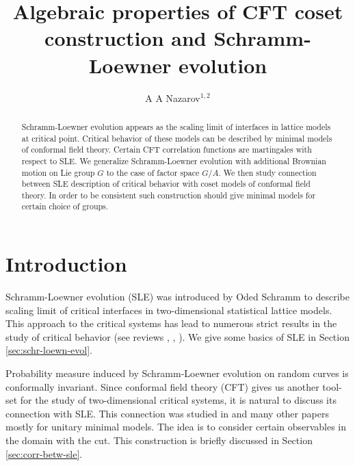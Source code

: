 \documentclass[a4paper]{jpconf}
\theoremstyle{definition}
\theoremstyle{definition} \newtheorem{Def}{Definition}
\begin{document}
\title{Algebraic properties of CFT coset construction and Schramm-Loewner evolution}
\author{A A Nazarov$^{1,2}$}
\address{
  $^1$ Department of High-Energy and Elementary Particle Physics, 
  Faculty of Physics, \\ SPb State University
  198904, Saint-Petersburg, Russia}
\address{
  $^{2}$ Chebyshev Laboratory,
  Faculty of Mathematics and Mechanics, \\ SPb State University
  199178, Saint-Petersburg, Russia}


\begin{abstract}
  Schramm-Loewner evolution appears as the scaling limit of interfaces in lattice models at critical point. Critical behavior of these models can be described by minimal models of conformal field theory. Certain CFT correlation functions are martingales with respect to SLE. 
  We generalize Schramm-Loewner evolution with additional Brownian motion on Lie group $G$ to the case of factor space $G/A$. We then study connection between SLE description of critical behavior with coset models of conformal field theory. In order to be consistent such construction should give minimal models for certain choice of groups. 


\end{abstract}

\section{Introduction}
Schramm-Loewner evolution (SLE) was introduced by Oded Schramm  \cite{schramm2000scaling} to describe scaling limit of critical interfaces in two-dimensional statistical lattice models. This approach to the critical systems has lead to numerous strict results in the study of critical behavior (see reviews  \cite{rohde2005basic}, \cite{bauer20062d}, \cite{Cardy:2005kh}). We give some basics of SLE in Section \ref{sec:schr-loewn-evol}.  

Probability measure induced by Schramm-Loewner evolution on random curves is conformally invariant. Since conformal field theory (CFT) gives us another tool-set for the study of two-dimensional critical systems, it is natural to discuss its connection with SLE.  This connection  was studied in \cite{bauer2004conformal,bauer2004cfts,bauer2003sle,bauer2002sle} and many other papers mostly for unitary minimal models.
The idea is to consider certain observables in the domain with the cut. This construction is briefly discussed in Section \ref{sec:corr-betw-sle}. 
\end{document}
